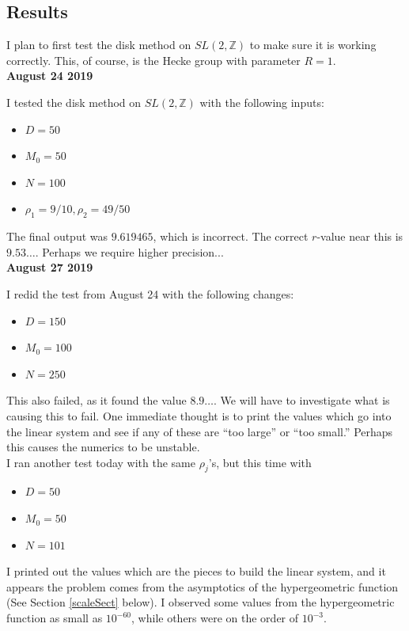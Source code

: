 \documentclass[]{article}
\begin{document}
\subsection{Results}

I plan to first test the disk method on $SL(2, \mathbb{Z})$ to make sure it is working correctly.
This, of course, is the Hecke group with parameter $R = 1$.
\\

\noindent \textbf{August 24 2019}

I tested the disk method on $SL(2, \mathbb{Z})$ with the following inputs:
\begin{itemize}
	\item $D = 50$
	\item $M_0 = 50$
	\item $N = 100$
	\item $\rho_1 = 9/10, \rho_2 = 49/50$
\end{itemize}
The final output was $9.619465$, which is incorrect.
The correct $r$-value near this is $9.53\dots$.
Perhaps we require higher precision...
\\

\noindent \textbf{August 27 2019}

I redid the test from August 24 with the following changes:
\begin{itemize}
	\item $D = 150$
	\item $M_0 = 100$
	\item $N = 250$
\end{itemize}
This also failed, as it found the value $8.9\dots$.
We will have to investigate what is causing this to fail.
One immediate thought is to print the values which go into the linear system and see if any of these are ``too large'' or ``too small.''
Perhaps this causes the numerics to be unstable.
\\

I ran another test today with the same $\rho_j$'s, but this time with
\begin{itemize}
	\item $D = 50$
	\item $M_0 = 50$
	\item $N = 101$
\end{itemize}
I printed out the values which are the pieces to build the linear system, and it appears the problem comes from the asymptotics of the hypergeometric function (See Section \ref{scaleSect} below).
I observed some values from the hypergeometric function as small as $10^{-60}$, while others were on the order of $10^{-3}$.
\\
\end{document}
